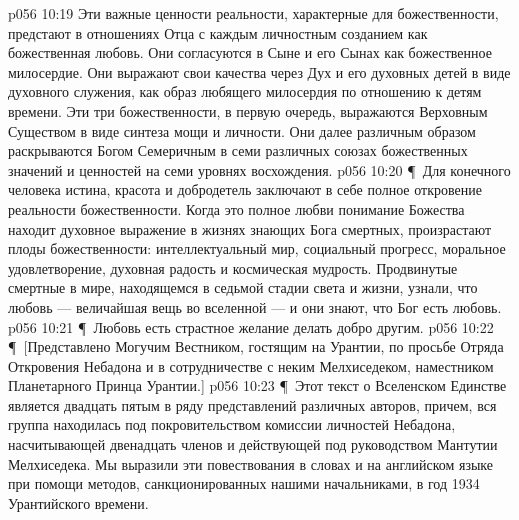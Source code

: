 \vs p056 10:19 Эти важные ценности реальности, характерные для божественности, предстают в отношениях Отца с каждым личностным созданием как божественная любовь. Они согласуются в Сыне и его Сынах как божественное милосердие. Они выражают свои качества через Дух и его духовных детей в виде духовного служения, как образ любящего милосердия по отношению к детям времени. Эти три божественности, в первую очередь, выражаются Верховным Существом в виде синтеза мощи и личности. Они далее различным образом раскрываются Богом Семеричным в семи различных союзах божественных значений и ценностей на семи уровнях восхождения.
\vs p056 10:20 \P\ Для конечного человека истина, красота и добродетель заключают в себе полное откровение реальности божественности. Когда это полное любви понимание Божества находит духовное выражение в жизнях знающих Бога смертных, произрастают плоды божественности: интеллектуальный мир, социальный прогресс, моральное удовлетворение, духовная радость и космическая мудрость. Продвинутые смертные в мире, находящемся в седьмой стадии света и жизни, узнали, что любовь --- величайшая вещь во вселенной --- и они знают, что Бог есть любовь.
\vs p056 10:21 \P\ Любовь есть страстное желание делать добро другим.
\vs p056 10:22 \P\ [Представлено Могучим Вестником, гостящим на Урантии, по просьбе Отряда Откровения Небадона и в сотрудничестве с неким Мелхиседеком, наместником Планетарного Принца Урантии.]
\separatorline
\vs p056 10:23 \P\ Этот текст о Вселенском Единстве является двадцать пятым в ряду представлений различных авторов, причем, вся группа находилась под покровительством комиссии личностей Небадона, насчитывающей двенадцать членов и действующей под руководством Мантутии Мелхиседека. Мы выразили эти повествования в словах и на английском языке при помощи методов, санкционированных нашими начальниками, в год 1934 Урантийского времени.
